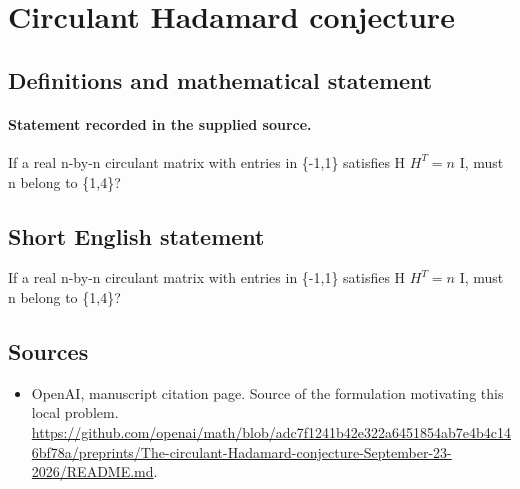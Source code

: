 \documentclass[11pt]{article}
\begin{document}
\section*{Circulant Hadamard conjecture}\label{statement}
\subsection{Definitions and mathematical statement}
\paragraph{Statement recorded in the supplied source.}
If a real n-by-n circulant matrix with entries in \{-1,1\} satisfies H $H^T=n$ I, must n belong to \{1,4\}?
\subsection{Short English statement}
If a real n-by-n circulant matrix with entries in \{-1,1\} satisfies H $H^T=n$ I, must n belong to \{1,4\}?
\subsection{Sources}
\begin{itemize}
\item[S1] OpenAI, manuscript citation page. Source of the formulation motivating this local problem.
\url{https://github.com/openai/math/blob/adc7f1241b42e322a6451854ab7e4b4c146bf78a/preprints/The-circulant-Hadamard-conjecture-September-23-2026/README.md}.
\end{itemize}
\end{document}
